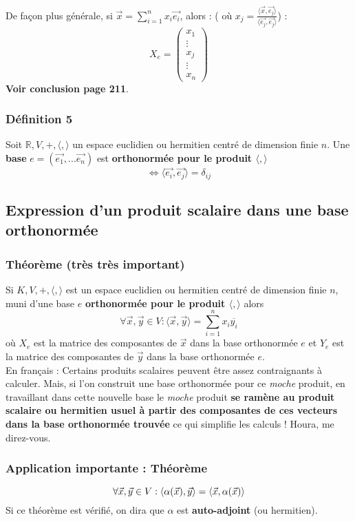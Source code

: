 \documentclass[12pt, a4paper, openany]{article}
\begin{document}
De façon plus générale, si $\vec{x} = \sum_{i=1}^n x_i\vec{e_i}$, alors : ( où $x_j = \frac{\langle\vec{x}, \vec{e_j} \rangle}{\langle\vec{e_j}, \vec{e_j}\rangle}$) :
$$X_e = \begin{pmatrix} 
x_1\\
\vdots\\ 
x_j\\
\vdots\\
x_n \end{pmatrix}$$
\textbf{Voir conclusion page 211}.

\subsubsection*{Définition 5}
Soit $\mathbb{R}, V, +, \langle , \rangle$ un espace euclidien ou hermitien centré de dimension finie $n$. Une \textbf{base} $e = (\vec{e_1}, ... \vec{e_n})$ est \textbf{orthonormée pour le produit $\langle , \rangle$}
$$\Leftrightarrow \langle\vec{e_i}, \vec{e_j}\rangle = \delta_{ij}$$

\subsection{Expression d'un produit scalaire dans une base orthonormée}
\subsubsection{Théorème (très très important)}
Si $K , V, +, \langle , \rangle$ est un espace euclidien ou hermitien centré de dimension finie $n$, muni d'une base $e$ \textbf{orthonormée pour le produit $\langle , \rangle$} alors 
$$\forall \vec{x}, \vec{y} \in V : \langle \vec{x}, \vec{y}\rangle = \sum_{i=1}^n x_i\overline{y_i}$$
où $X_e$ est la matrice des composantes de $\vec{x}$ dans la base orthonormée $e$ et $Y_e$ est la matrice des composantes de $\vec{y}$ dans la base orthonormée $e$.\\

En français : Certains produits scalaires peuvent être assez contraignants à calculer. Mais, si l'on construit une base orthonormée pour ce \textit{moche} produit, en travaillant dans cette nouvelle base le \textit{moche} produit \textbf{se ramène au produit scalaire ou hermitien usuel à partir des composantes de ces vecteurs dans la base orthonormée trouvée} ce qui simplifie les calculs ! Houra, me direz-vous.


\subsubsection*{Application importante : Théorème}
$$\forall \vec{x}, \vec{y} \in V : \pscal{\alpha(\vec{x})}{\vec{y}} = \pscal{\vec{x}}{\alpha(\vec{x})}$$
Si ce théorème est vérifié, on dira que $\alpha$ est \textbf{auto-adjoint} (ou hermitien).
\end{document}
